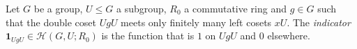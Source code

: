 Let $G$ be a group, $U\le G$ a subgroup, $R_0$ a commutative ring and $g\in G$ such that the double coset $UgU$ meets only finitely many left cosets $xU$. The \emph{indicator} $\mathbf 1_{UgU}\in\mathcal H(G,U;R_0)$ is the function that is $1$ on $UgU$ and $0$ elsewhere.
